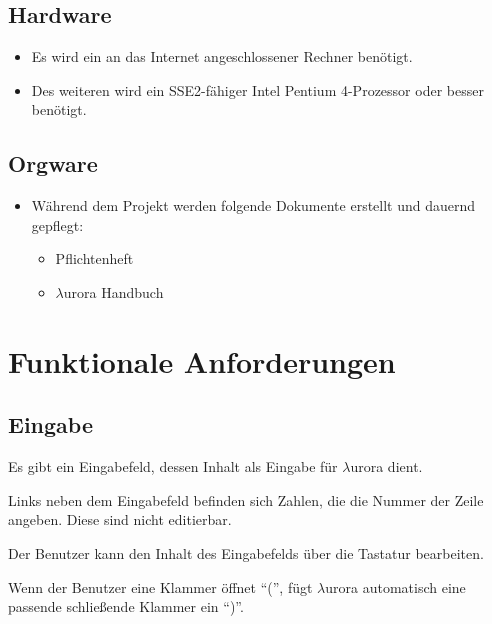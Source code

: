 \documentclass[parskip=full,11pt,twoside]{scrartcl}
\begin{document}
\subsection{Hardware}
	\begin{itemize}
		\item Es wird ein an das Internet angeschlossener Rechner benötigt.
		\item Des weiteren wird ein SSE2-fähiger Intel Pentium 4-Prozessor oder besser benötigt.
	\end{itemize}
\subsection{Orgware}
	\begin{itemize}
		\item Während dem Projekt werden folgende Dokumente erstellt und dauernd gepflegt:
			\begin{itemize}
				\item Pflichtenheft
				\item $\lambda$urora Handbuch
			\end{itemize}
	\end{itemize}
\newpage


\section{Funktionale Anforderungen}

\subsection{Eingabe}

Es gibt ein Eingabefeld, dessen Inhalt als Eingabe für $\lambda$urora dient.

Links neben dem Eingabefeld befinden sich Zahlen, die die Nummer der Zeile angeben. Diese sind nicht editierbar.

Der Benutzer kann den Inhalt des Eingabefelds über die Tastatur bearbeiten.

Wenn der Benutzer eine Klammer öffnet \enquote{(}, fügt $\lambda$urora automatisch eine passende schließende Klammer ein \enquote{)}.
\end{document}
